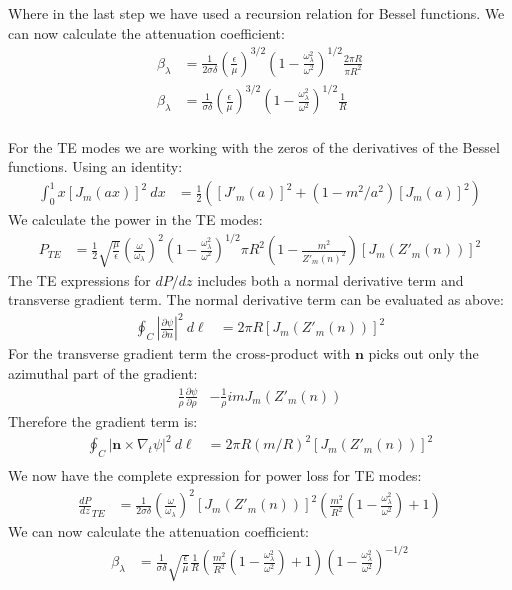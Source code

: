 \documentclass[a4paper,11pt]{article}
\numberwithin{equation}{section}
\newcommand{\bv}[1]{\mathbf{#1}}
\newcommand{\lrp}[1]{\left({#1}\right)}
\begin{document}
Where in the last step we have used a recursion relation for Bessel functions.
We can now calculate the attenuation coefficient:
\begin{align}
 \beta_\lambda &= \frac{1}{2\sigma\delta}\lrp{\frac{\epsilon}{\mu}}^{3/2}\lrp{1-\frac{\omega_\lambda^2}{\omega^2}}^{1/2}\frac{2\pi R}{\pi R^2}\\
 \beta_\lambda &= \frac{1}{\sigma\delta}\lrp{\frac{\epsilon}{\mu}}^{3/2}\lrp{1-\frac{\omega_\lambda^2}{\omega^2}}^{1/2}\frac{1}{R}
\end{align}
\\
For the TE modes we are working with the zeros of the derivatives of the Bessel functions. 
Using an identity:
\begin{align}
 \int_0^1 x\left[J_m(ax) \right]^2\ dx &= \frac{1}{2}\lrp{[J'_m(a)]^2+(1-m^2/a^2)[J_m(a)]^2}
\end{align}
We calculate the power in the TE modes:
\begin{align}
 P_{TE} &= \frac{1}{2}\sqrt{\frac{\mu}{\epsilon}}\lrp{\frac{\omega}{\omega_\lambda}}^2\lrp{1-\frac{\omega_\lambda^2}{\omega^2}}^{1/2}\pi R^2\lrp{1-\frac{m^2}{Z'_m(n)^2}}\left[J_{m}(Z'_m(n))\right]^2
\end{align}
The TE expressions for $dP/dz$ includes both a normal derivative term and transverse gradient term. 
The normal derivative term can be evaluated as above:
\begin{align}
 \oint_C |\frac{\partial \psi}{\partial n}|^2\ d\ell &= 2\pi R [J_m(Z'_m(n))]^2
\end{align}
For the transverse gradient term the cross-product with $\bv{n}$ picks out only the azimuthal part of the gradient:
\begin{align}
 \frac{1}{\rho}\frac{\partial \psi}{\partial \rho} &- \frac{1}{\rho}imJ_m(Z'_m(n)) 
\end{align}
Therefore the gradient term is:
\begin{align}
 \oint_C |\bv{n} \times \nabla_t\psi|^2\ d\ell &= 2\pi R \lrp{m/R}^2[J_m(Z'_m(n))]^2\\
\end{align}
We now have the complete expression for power loss for TE modes:
\begin{align}
  \frac{dP}{dz}_{TE} &= \frac{1}{2\sigma\delta}\lrp{\frac{\omega}{\omega_\lambda}}^2
			[J_m(Z'_m(n))]^2\lrp{\frac{m^2}{R^2}\lrp{1-\frac{\omega_\lambda^2}{\omega^2}}+1} 
\end{align}
We can now calculate the attenuation coefficient:
\begin{align}
 \beta_\lambda &= \frac{1}{\sigma\delta} \sqrt{\frac{\epsilon}{\mu}}\frac{1}{R} 
	\lrp{\frac{m^2}{R^2}\lrp{1-\frac{\omega_\lambda^2}{\omega^2}}+1}
	\lrp{1-\frac{\omega_\lambda^2}{\omega^2}}^{-1/2}
\end{align}
\end{document}
